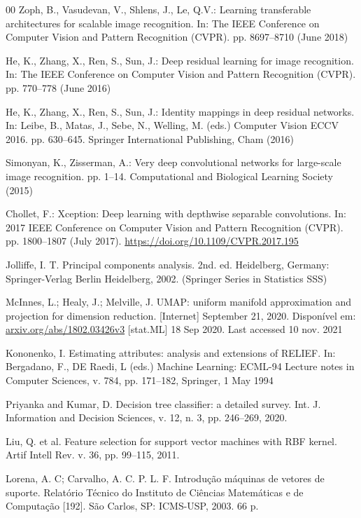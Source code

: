 \documentclass[final,5p,times,twocolumn]{elsarticle}
\begin{document}
\begin{thebibliography}{00}
Zoph, B., Vasudevan, V., Shlens, J., Le, Q.V.: Learning transferable architectures for scalable image recognition. In: The IEEE Conference on Computer Vision and Pattern Recognition (CVPR). pp. 8697--8710 (June 2018)

He, K., Zhang, X., Ren, S., Sun, J.: Deep residual learning for image recognition. In: The IEEE Conference on Computer Vision and Pattern Recognition (CVPR). pp. 770--778 (June 2016)

He, K., Zhang, X., Ren, S., Sun, J.: Identity mappings in deep residual networks. In: Leibe, B., Matas, J., Sebe, N., Welling, M. (eds.) Computer Vision ECCV 2016. pp. 630--645. Springer International Publishing, Cham (2016)

Simonyan, K., Zisserman, A.: Very deep convolutional networks for large-scale image recognition. pp. 1--14. Computational and Biological Learning Society (2015)

Chollet, F.: Xception: Deep learning with depthwise separable convolutions. In: 2017 IEEE Conference on Computer Vision and Pattern Recognition (CVPR). pp. 1800--1807 (July 2017). \url{https://doi.org/10.1109/CVPR.2017.195}

Jolliffe, I. T. Principal components analysis. 2nd. ed. Heidelberg, Germany: Springer-Verlag Berlin Heidelberg, 2002. (Springer Series in Statistics SSS)

McInnes, L.; Healy, J.; Melville, J. UMAP: uniform manifold approximation and projection for dimension reduction. [Internet] September 21, 2020. Disponível em: \url{arxiv.org/abs/1802.03426v3} [stat.ML] 18 Sep 2020. Last accessed 10 nov. 2021

Kononenko, I. Estimating attributes: analysis and extensions of RELIEF. In: Bergadano, F., DE Raedi, L (eds.) Machine Learning: ECML-94 Lecture notes in Computer Sciences, v. 784, pp. 171--182, Springer, 1 May 1994

Priyanka and Kumar, D. Decision tree classifier: a detailed survey. Int. J. Information and Decision Sciences, v. 12, n. 3, pp. 246--269, 2020.

Liu, Q. et al. Feature selection for support vector machines with RBF kernel. Artif Intell Rev. v. 36, pp. 99--115, 2011.

Lorena, A. C; Carvalho, A. C. P. L. F. Introdução máquinas de vetores de suporte. Relatório Técnico do Instituto de Ciências Matemáticas e de Computação [192]. São Carlos, SP: ICMS-USP, 2003. 66 p.


\end{thebibliography}
\end{document}
